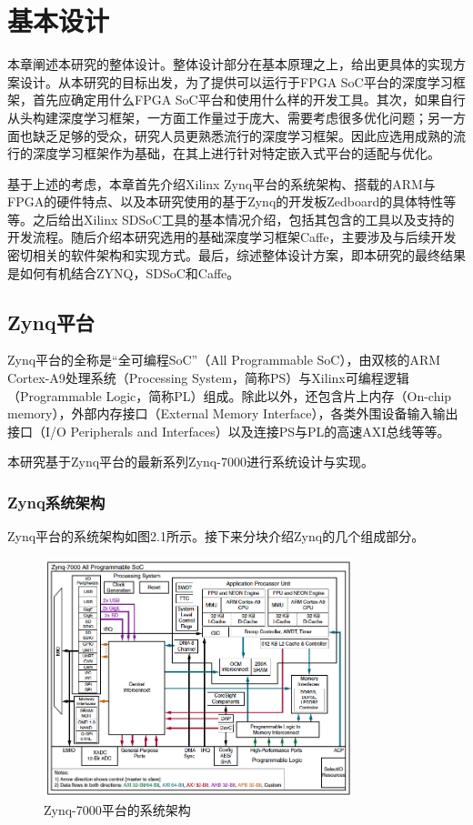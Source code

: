 
\chapter{基本设计}

本章阐述本研究的整体设计。整体设计部分在基本原理之上，给出更具体的实现方案设计。从本研究的目标出发，为了提供可以运行于FPGA SoC平台的深度学习框架，首先应确定用什么FPGA SoC平台和使用什么样的开发工具。其次，如果自行从头构建深度学习框架，一方面工作量过于庞大、需要考虑很多优化问题；另一方面也缺乏足够的受众，研究人员更熟悉流行的深度学习框架。因此应选用成熟的流行的深度学习框架作为基础，在其上进行针对特定嵌入式平台的适配与优化。

基于上述的考虑，本章首先介绍Xilinx Zynq平台的系统架构、搭载的ARM与FPGA的硬件特点、以及本研究使用的基于Zynq的开发板Zedboard的具体特性等等。之后给出Xilinx SDSoC工具的基本情况介绍，包括其包含的工具以及支持的开发流程。随后介绍本研究选用的基础深度学习框架Caffe，主要涉及与后续开发密切相关的软件架构和实现方式。最后，综述整体设计方案，即本研究的最终结果是如何有机结合ZYNQ，SDSoC和Caffe。

\section{Zynq平台}

Zynq平台的全称是“全可编程SoC”（All Programmable SoC），由双核的ARM Cortex-A9处理系统（Processing System，简称PS）与Xilinx可编程逻辑（Programmable Logic，简称PL）组成。除此以外，还包含片上内存（On-chip memory），外部内存接口（External Memory Interface），各类外围设备输入输出接口（I/O Peripherals and Interfaces）以及连接PS与PL的高速AXI总线等等。

本研究基于Zynq平台的最新系列Zynq-7000进行系统设计与实现。

\subsection{Zynq系统架构}

Zynq平台的系统架构如图2.1所示。接下来分块介绍Zynq的几个组成部分。

\begin{figure}[!ht]
\centering
	\includegraphics[width=0.8\textwidth]{assets/imgs/zynq-7000}
\caption{Zynq-7000平台的系统架构}
\end{figure}


